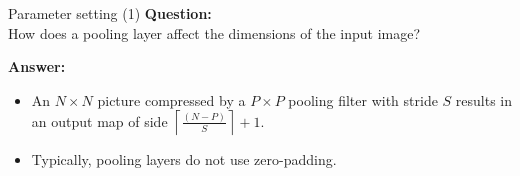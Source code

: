 \documentclass[default, aspectratio=169]{beamer}
\begin{document}
\begin{frame}{Parameter setting (1)}
	\textbf{Question:} \\
	How does a pooling layer affect the dimensions of the input image?
	
	\bigskip
	
	\textbf{Answer:} \\
	\begin{itemize}
		\item An $N \times N$ picture compressed by a $P \times P$ pooling filter with stride $S$ results in an output map of side $\left\lceil \frac{(N - P)}{S} \right\rceil + 1$.
		\item Typically, pooling layers do not use zero-padding.
	\end{itemize}
\end{frame}
\end{document}
